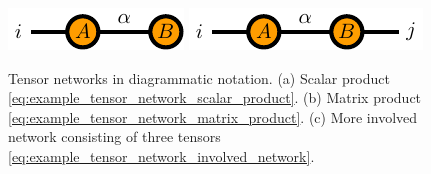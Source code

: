 \begin{figure}
	\centering
	\subcaptionbox{\label{fig:basic_tensor_networks_matrix_vector_product}}
	{%
		\raisebox{\dimexpr.5\ht\largestimage-.5\height}
		{%
			\includegraphics[scale=1]{figures/tikz/Tensor_Networks/basic_networks/basic_networks_a.pdf}
		}
	}
\subcaptionbox{\label{fig:basic_tensor_networks_matrix_product}}
	{%
		\raisebox{\dimexpr.5\ht\largestimage-.5\height}
		{%
			\includegraphics[scale=1]{figures/tikz/Tensor_Networks/basic_networks/basic_networks_b.pdf}
		}
	}
\subcaptionbox{\label{fig:basic_tensor_networks_involved_contraction}}
	{%
		\usebox{\largestimage}
	}
	\caption{Tensor networks in diagrammatic notation. (a) Scalar product \eqref{eq:example_tensor_network_scalar_product}. (b) Matrix product \eqref{eq:example_tensor_network_matrix_product}. (c) More involved network consisting of three tensors \eqref{eq:example_tensor_network_involved_network}.}
	\label{fig:basic_tensor_network_diagrams}
\end{figure}
